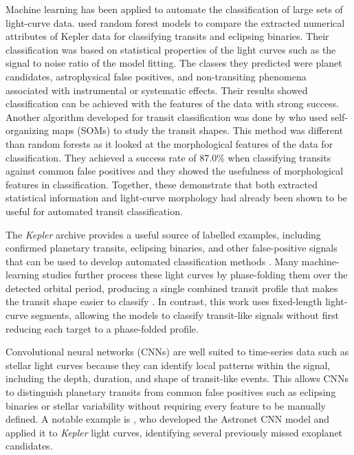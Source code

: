 Machine learning has been applied to automate the classification of large sets of light-curve data. \cite{2015ApJ...806....6M} used random forest models to compare the extracted numerical attributes of Kepler data for classifying transits and eclipsing binaries. Their classification was based on statistical properties of the light curves such as the signal to noise ratio of the model fitting. The classes they predicted were planet candidates, astrophysical false positives, and non-transiting phenomena associated with instrumental or systematic effects. Their results showed classification can be achieved with the features of the data with strong success. Another algorithm developed for transit classification was done by \cite{2017MNRAS.465.2634A} who used self-organizing maps (SOMs) to study the transit shapes. This method was different than random forests as it looked at the morphological features of the data for classification. They achieved a success rate of 87.0\% when classifying transits against common false positives and they showed the usefulness of morphological features in classification. Together, these demonstrate that both extracted statistical information and light-curve morphology had already been shown to be useful for automated transit classification.

The \textit{Kepler} archive provides a useful source of labelled examples, including confirmed planetary transits, eclipsing binaries, and other false-positive signals that can be used to develop automated classification methods \citep{2018ApJS..235...38T}. Many machine-learning studies further process these light curves by phase-folding them over the detected orbital period, producing a single combined transit profile that makes the transit shape easier to classify \citep{2018AJ....155...94S}. In contrast, this work uses fixed-length light-curve segments, allowing the models to classify transit-like signals without first reducing each target to a phase-folded profile.

Convolutional neural networks (CNNs) are well suited to time-series data such as stellar light curves because they can identify local patterns within the signal, including the depth, duration, and shape of transit-like events. This allows CNNs to distinguish planetary transits from common false positives such as eclipsing binaries or stellar variability without requiring every feature to be manually defined. A notable example is \citet{2018AJ....155...94S}, who developed the Astronet CNN model and applied it to \textit{Kepler} light curves, identifying several previously missed exoplanet candidates.

